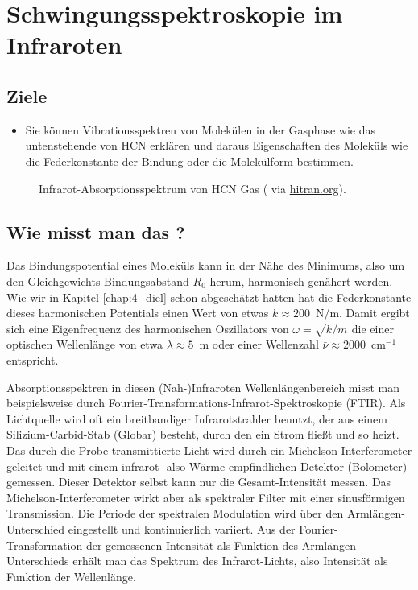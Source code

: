 \renewcommand{\chapterauthors}{Markus Lippitz}
\renewcommand{\lastmod}{28. Oktober 2021}


\chapter{Schwingungsspektroskopie im Infraroten}

\label{chap:vib}



\section{Ziele}

\begin{itemize}
\item Sie können Vibrationsspektren von Molekülen in der Gasphase wie das untenstehende von HCN erklären und daraus Eigenschaften des Moleküls wie die  Federkonstante der Bindung oder die  Molekülform bestimmen.
\end{itemize}


\begin{figure}
\caption{Infrarot-Absorptionsspektrum von HCN Gas  (\cite{Maki_1995_HCN} via \href{https://hitran.org}{hitran.org}).
\label{fig:vib_hcn}}
\end{figure}


\section{Wie misst man das ?}

Das Bindungspotential eines Moleküls kann in der Nähe des Minimums, also um den Gleichgewichts-Bindungsabstand $R_0$ herum, harmonisch genähert werden.
Wie wir in Kapitel \ref{chap:4_diel} schon abgeschätzt hatten hat die Federkonstante dieses harmonischen Potentials einen Wert von etwas $k \approx 200$~N/m. Damit ergibt sich eine Eigenfrequenz des harmonischen Oszillators von $\omega = \sqrt{k / m}$ die einer optischen Wellenlänge von etwa $\lambda \approx 5$~\textmu m oder einer Wellenzahl $\bar{\nu} \approx 2000$~cm$^{-1}$ entspricht. 

Absorptionsspektren in diesen (Nah-)Infraroten Wellenlängenbereich misst man beispielsweise durch Fourier-Transformations-Infrarot-Spektroskopie (FTIR). Als Lichtquelle wird oft ein breitbandiger Infrarotstrahler benutzt, der aus einem Silizium-Carbid-Stab (Globar) besteht, durch den ein Strom fließt und so heizt. Das durch die Probe transmittierte Licht wird durch ein Michelson-Interferometer geleitet und mit einem infrarot-  also Wärme-empfindlichen Detektor (Bolometer) gemessen. Dieser Detektor selbst kann nur die Gesamt-Intensität messen. Das Michelson-Interferometer wirkt aber als spektraler Filter mit einer sinusförmigen Transmission. Die Periode der spektralen Modulation wird über den Armlängen-Unterschied eingestellt und kontinuierlich variiert. Aus der Fourier-Transformation der gemessenen Intensität als Funktion des Armlängen-Unterschieds erhält man das Spektrum des Infrarot-Lichts, also Intensität als Funktion der Wellenlänge.


